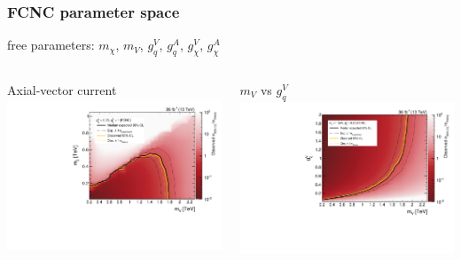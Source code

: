 \documentclass[aspectratio=169,xcolor=dvipsnames,,table,compress]{beamer}
\begin{document}
\begin{frame}[t] \frametitle{FCNC parameter space}
   free parameters: $m_\chi$, $m_V$, $g_q^V$, $g_q^A$, $g_\chi^V$, $g_\chi^A$
  \vspace{5mm}
  \begin{columns}
    \begin{column}{0.33\textwidth}
      \centering Axial-vector current \\ 
      \includegraphics[width=\textwidth]{../figures/monotop/results/fcnc2d_obs_axial.pdf}
    \end{column}
    \begin{column}{0.33\textwidth}
      \centering $m_V$ vs $g_q^V$  \\ 
      \includegraphics[width=\textwidth]{../figures/monotop/results/fcnc2d_obs_gdmv_mV.pdf}

\end{column}
\end{columns}
\end{frame}
\end{document}
